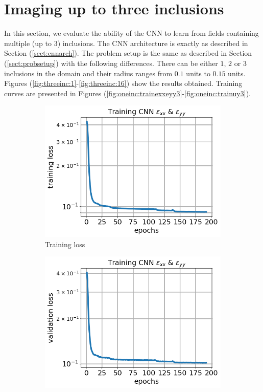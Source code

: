 \documentclass[12pt]{article}
\newcommand{\nhgfigheight}{4.0cm}
\begin{document}
\section{\label{sect:threeinc}Imaging up to three inclusions}
In this section, we evaluate the ability of the CNN to learn from fields containing multiple (up to $3$) inclusions. The CNN architecture is exactly as described in Section (\ref{sect:cnnarch}). The problem setup is the same as described in Section (\ref{sect:probsetup}) with the following differences. There can be either $1$, $2$ or $3$ inclusions in the domain and their radius ranges from $0.1$ units to $0.15$ units. Figures (\ref{fig:threeinc:1}-\ref{fig:threeinc:16}) show the results obtained. Training curves are presented in Figures (\ref{fig:oneinc:trainexxeyy3}-\ref{fig:oneinc:trainuy3}).
%
\begin{figure}[h]
  \centering
  \begin{subfigure}[b]{0.45\linewidth}
    \includegraphics[totalheight=\nhgfigheight]{Figures/final3/training/exxeyy/field_strainxxyy_plot_loss.png}
    \caption{Training loss}
  \end{subfigure}
  \begin{subfigure}[b]{0.45\linewidth}
    \includegraphics[totalheight=\nhgfigheight]{Figures/final3/training/exxeyy/field_strainxxyy_plot_val_loss.png}

\end{subfigure}
\end{figure}
\end{document}
